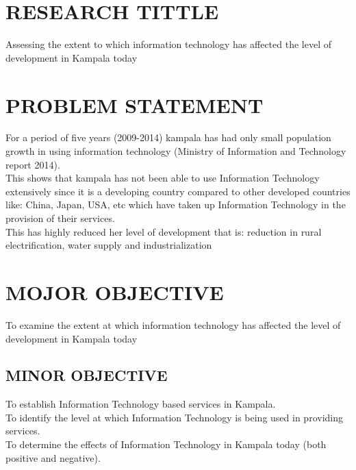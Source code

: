 \documentclass[12pt,]{article}
\begin{document}
\newpage
\tableofcontents
\newpage


\section{RESEARCH TITTLE}
Assessing the extent to which information technology has affected the level of development in Kampala today

\section{PROBLEM STATEMENT}
For a period of five years (2009-2014) kampala has had only           small population growth in using information technology (Ministry of Information and Technology report 2014).\\
 This shows that kampala has not been able to use Information Technology extensively since it is a developing country compared to other developed countries like: China, Japan, USA, etc which have taken up Information Technology in the provision of their services.\\  This has highly reduced her level of development that is: reduction in rural electrification, water supply and industrialization

\section{MOJOR OBJECTIVE}
To examine the extent at which information technology has affected the level of development in Kampala today 

\subsection{MINOR OBJECTIVE}
	To establish Information Technology based services in Kampala.\\To identify the level at which Information Technology is being used in providing services. \\To determine the effects of Information Technology in Kampala today (both positive and negative).
\end{document}

